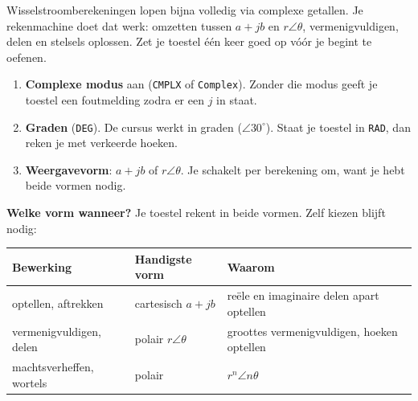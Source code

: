 \documentclass[a4paper,11pt]{article}
\begin{document}
Wisselstroomberekeningen lopen bijna volledig via complexe getallen. Je rekenmachine doet dat werk:
omzetten tussen $a+jb$ en $r\angle\theta$, vermenigvuldigen, delen en stelsels oplossen. Zet je
toestel \'e\'en keer goed op v\'o\'or je begint te oefenen.

\begin{theorie}
    \begin{enumerate}
        \item \textbf{Complexe modus} aan (\texttt{CMPLX} of \texttt{Complex}). Zonder die modus geeft
              je toestel een foutmelding zodra er een $j$ in staat.
        \item \textbf{Graden} (\texttt{DEG}). De cursus werkt in graden ($\angle 30^\circ$). Staat je
              toestel in \texttt{RAD}, dan reken je met verkeerde hoeken.
        \item \textbf{Weergavevorm}: $a+jb$ of $r\angle\theta$. Je schakelt per berekening om, want je
              hebt beide vormen nodig.
    \end{enumerate}
\end{theorie}

\textbf{Welke vorm wanneer?} Je toestel rekent in beide vormen. Zelf kiezen blijft nodig:

\begin{center}
    \begin{tabular}{@{}p{42mm}p{40mm}p{50mm}@{}}
        \toprule
        \textbf{Bewerking}       & \textbf{Handigste vorm} & \textbf{Waarom}                            \\
        \midrule
        optellen, aftrekken      & cartesisch $a+jb$       & re\"ele en imaginaire delen apart optellen \\
        vermenigvuldigen, delen  & polair $r\angle\theta$  & groottes vermenigvuldigen, hoeken optellen \\
        machtsverheffen, wortels & polair                  & $r^n\angle n\theta$                        \\
        \bottomrule
    \end{tabular}
\end{center}
\end{document}
